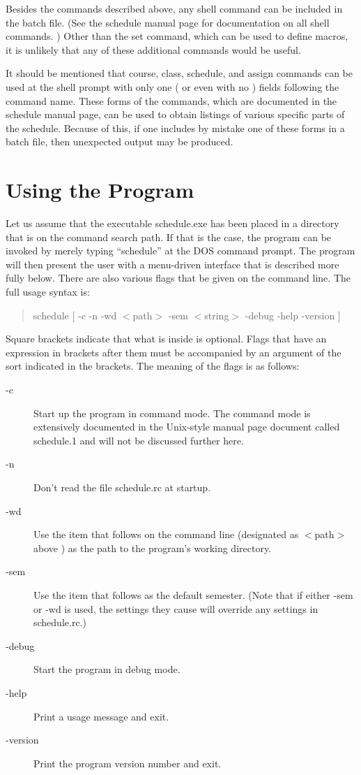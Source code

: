 Besides the commands described above, any shell command can be included in
the batch file. (See the schedule manual page for documentation on all shell
commands. ) Other than the set command, which can be used to define macros,
it is unlikely that any of these additional commands would be useful. 

It should be mentioned that course, class, schedule, and assign commands
can be used at the shell prompt with only one ( or even with no ) fields
following the command name. These forms of the commands, which are
documented in the schedule manual page, can be used to obtain listings of
various specific parts of the schedule. Because of this, if one includes
by mistake one of these forms in a batch file, then unexpected output
may be produced.  

\section{Using the Program}

Let us assume that the executable schedule.exe has been placed in a directory
that is on the command search path. If that is the case, the program 
can be invoked by merely typing ``schedule'' at the DOS command prompt. 
The program will then present the user with a menu-driven interface that
is described more fully below. There are also various flags that be
given on the command line. The full usage syntax is:
\begin{quote}
schedule [ -c -n  -wd $<$path$>$ -sem $<$string$>$ -debug -help -version ]
\end{quote}
Square brackets indicate that what is inside is optional. Flags that have
an expression in brackets after them must be accompanied by an argument 
of the sort indicated in the brackets. 
The meaning of the flags is as follows:
\begin{description}
\item [-c] Start up the program in command mode. The command mode is 
extensively documented in the Unix-style manual page document called
schedule.1 and will not be discussed further here.
\item [-n] Don't read the file schedule.rc at startup.
\item [-wd] Use the item that follows on the command line (designated as 
$<$path$>$ above ) as the path to the program's working directory. 
\item [-sem ] Use the item that follows as the default semester. (Note that
if either -sem or -wd is used, the settings they cause will override any
settings in schedule.rc.)
\item [-debug] Start the program in debug mode.
\item [-help] Print a usage message and exit.
\item [-version] Print the program version number and exit.
\end{description}

